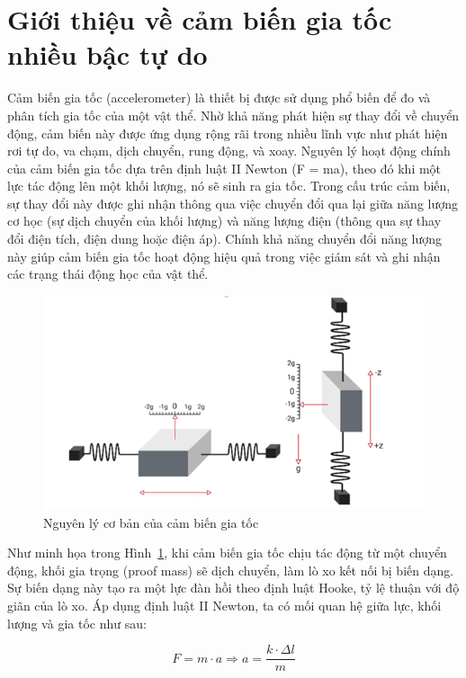 \section{Giới thiệu về cảm biến gia tốc nhiều bậc tự do}
Cảm biến gia tốc (accelerometer) là thiết bị được sử dụng phổ biến để đo và phân tích gia tốc của một vật thể. Nhờ khả năng phát hiện sự thay đổi về chuyển động, cảm biến này được ứng dụng rộng rãi trong nhiều lĩnh vực như phát hiện rơi tự do, va chạm, dịch chuyển, rung động, và xoay. Nguyên lý hoạt động chính của cảm biến gia tốc dựa trên định luật II Newton (F = ma), theo đó khi một lực tác động lên một khối lượng, nó sẽ sinh ra gia tốc. Trong cấu trúc cảm biến, sự thay đổi này được ghi nhận thông qua việc chuyển đổi qua lại giữa năng lượng cơ học (sự dịch chuyển của khối lượng) và năng lượng điện (thông qua sự thay đổi điện tích, điện dung hoặc điện áp). Chính khả năng chuyển đổi năng lượng này giúp cảm biến gia tốc hoạt động hiệu quả trong việc giám sát và ghi nhận các trạng thái động học của vật thể.

\begin{figure}[!ht]
		\centering
 		\includegraphics[width=\textwidth]{images/acce.png}
 		\vspace*{-7mm}
		\caption{Nguyên lý cơ bản của cảm biến gia tốc}
		\label{acce}
\end{figure}

Như minh họa trong Hình~\ref{acce}, khi cảm biến gia tốc chịu tác động từ một chuyển động, khối gia trọng (proof mass) sẽ dịch chuyển, làm lò xo kết nối bị biến dạng. Sự biến dạng này tạo ra một lực đàn hồi theo định luật Hooke, tỷ lệ thuận với độ giãn của lò xo. Áp dụng định luật II Newton, ta có mối quan hệ giữa lực, khối lượng và gia tốc như sau:

\begin{equation} F = m \cdot a \Rightarrow a = \frac{k \cdot \Delta l}{m} \end{equation}

